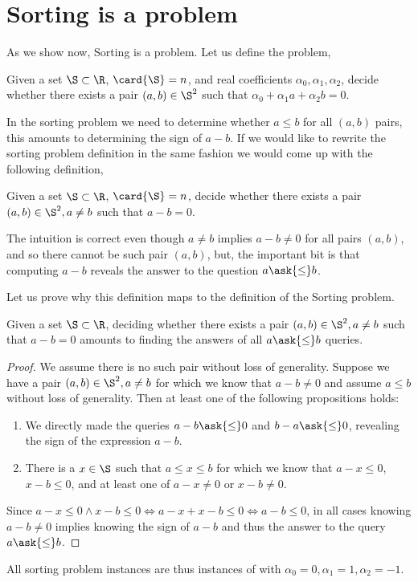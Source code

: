 \section{Sorting is a \twoLDT problem}

As we show now, Sorting is a \twoLDT problem. Let us define the
\twoLDT problem,

\begin{problem}[\twoLDT]
Given a set $\S \subset \R$, $\card{\S} = n$, and real coefficients $\alpha_0,
\alpha_1, \alpha_2$, decide whether there exists a pair $(a,b) \in \S^2$ such that
$\alpha_0 + \alpha_1 a + \alpha_2 b = 0$.
\end{problem}

In the sorting problem we need to determine whether $a \le b$ for all $(a,b)$
pairs, this amounts to determining the sign of $a-b$. If we would like to rewrite
the sorting problem definition in the same fashion we would come up with the
following definition,

\begin{problem}
Given a set $\S \subset \R$, $\card{\S} = n$, decide whether there exists a
pair $(a,b) \in \S^2, a \neq b$ such that $a - b = 0$.
\end{problem}

The intuition is correct even though $a \neq b$ implies $a-b \neq 0$ for all
pairs \((a,b)\), and so there cannot be such pair \((a,b)\), but, the important
bit is that computing $a-b$ reveals the answer to the question $a \ask{\le} b$.

Let us prove why this definition maps to the definition of the Sorting problem.

\begin{theorem}\label{thm:related:sorting}
Given a set \(\S \subset \R\), deciding whether there exists a pair \((a,b)
\in \S^2, a \neq b\) such that \(a - b = 0\) amounts to finding the answers of all \(a
\ask{\le} b\) queries.
\end{theorem}

\begin{proof}
We assume there is no such pair without loss of generality.
Suppose we have a pair \((a,b) \in \S^2, a \neq b\) for which we
know that \(a - b \neq 0\) and assume \(a \le b\) without loss of generality.
Then at least one of the following propositions holds:
\begin{enumerate}
\item We directly made the queries \(a - b
\ask{\le} 0\) and \(b - a \ask{\le} 0\), revealing the sign of the expression
\(a - b\).
\item There is a \(x \in \S\) such that \(a \le x \le b\) for which we
know that \(a - x \le 0\), \(x - b \le 0\), and at least one of \(a - x \neq
0\) or \(x - b \neq 0\).
\end{enumerate}
Since \(a - x \le 0 \land x - b \le 0 \iff a - x + x - b \le 0 \iff a - b \le
0\), in all cases knowing \(a - b \neq 0\) implies knowing the sign of \(a -
b\) and thus the answer to the query \(a \ask{\le} b\).
\end{proof}

All sorting problem instances are thus instances of \twoLDT with
$\alpha_0 = 0, \alpha_1 = 1, \alpha_2 = -1$.
